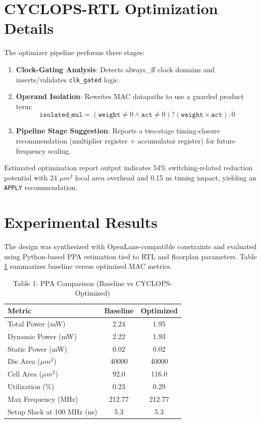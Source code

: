 \documentclass[10pt, conference]{IEEEtran}
\begin{document}
\section{CYCLOPS-RTL Optimization Details}
The optimizer pipeline performs three stages:
\begin{enumerate}
    \item \textbf{Clock-Gating Analysis}: Detects always\_ff clock domains and inserts/validates \texttt{clk\_gated} logic.
    \item \textbf{Operand Isolation}: Rewrites MAC datapaths to use a guarded product term:
    \[
    \texttt{isolated\_mul} = (\texttt{weight} \neq 0 \land \texttt{act} \neq 0) ? (\texttt{weight}\times\texttt{act}) : 0
    \]
    \item \textbf{Pipeline Stage Suggestion}: Reports a two-stage timing-closure recommendation (multiplier register + accumulator register) for future frequency scaling.
\end{enumerate}
Estimated optimization report output indicates 54\% switching-related reduction potential with 24 $\mu m^2$ local area overhead and 0.15 ns timing impact, yielding an \texttt{APPLY} recommendation.

\section{Experimental Results}
The design was synthesized with OpenLane-compatible constraints and evaluated using Python-based PPA estimation tied to RTL and floorplan parameters. Table \ref{tab:ppa} summarizes baseline versus optimized MAC metrics.

\begin{table}[h]
\centering
\caption{Table 1: PPA Comparison (Baseline vs CYCLOPS-Optimized)}
\label{tab:ppa}
\begin{tabular}{lcc}
\toprule
\textbf{Metric} & \textbf{Baseline} & \textbf{Optimized} \\
\midrule
Total Power (mW) & 2.24 & 1.95 \\
Dynamic Power (mW) & 2.22 & 1.93 \\
Static Power (mW) & 0.02 & 0.02 \\
Die Area ($\mu m^2$) & 40000 & 40000 \\
Cell Area ($\mu m^2$) & 92.0 & 116.0 \\
Utilization (\%) & 0.23 & 0.29 \\
Max Frequency (MHz) & 212.77 & 212.77 \\
Setup Slack at 100 MHz (ns) & 5.3 & 5.3 \\
\bottomrule
\end{tabular}
\end{table}
\end{document}
